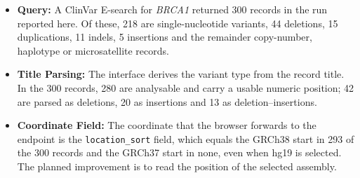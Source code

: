 \begin{itemize}
\item \textbf{Query:} A ClinVar E-search for \textit{BRCA1} returned 300 records in the run reported here. Of these, 218 are single-nucleotide variants, 44 deletions, 15 duplications, 11 indels, 5 insertions and the remainder copy-number, haplotype or microsatellite records.
\item \textbf{Title Parsing:} The interface derives the variant type from the record title. In the 300 records, 280 are analysable and carry a usable numeric position; 42 are parsed as deletions, 20 as insertions and 13 as deletion--insertions.
\item \textbf{Coordinate Field:} The coordinate that the browser forwards to the endpoint is the \texttt{location\_sort} field, which equals the GRCh38 start in 293 of the 300 records and the GRCh37 start in none, even when hg19 is selected. The planned improvement is to read the position of the selected assembly.
\end{itemize}

